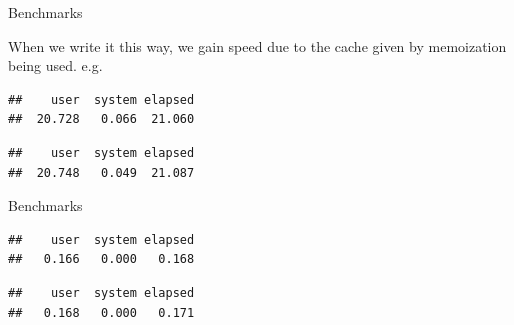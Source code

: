 \begin{frame}[fragile]{Benchmarks}

When we write it this way, we gain speed due to the cache given by
memoization being used. e.g.

\begin{Shaded}
\begin{Highlighting}[]
\NormalTok{(\{}\NormalTok{(}\NormalTok{)\}) }
\end{Highlighting}
\end{Shaded}

\begin{verbatim}
##    user  system elapsed 
##  20.728   0.066  21.060
\end{verbatim}

\begin{Shaded}
\begin{Highlighting}[]
\NormalTok{(\{}\NormalTok{(}\NormalTok{)\})   }
\end{Highlighting}
\end{Shaded}

\begin{verbatim}
##    user  system elapsed 
##  20.748   0.049  21.087
\end{verbatim}

\end{frame}

\begin{frame}[fragile]{Benchmarks}

\begin{Shaded}
\begin{Highlighting}[]
\NormalTok{(\{}\NormalTok{(}\NormalTok{)\}) }
\end{Highlighting}
\end{Shaded}

\begin{verbatim}
##    user  system elapsed 
##   0.166   0.000   0.168
\end{verbatim}

\begin{Shaded}
\begin{Highlighting}[]
\NormalTok{(\{}\NormalTok{(}\NormalTok{)\})   }
\end{Highlighting}
\end{Shaded}

\begin{verbatim}
##    user  system elapsed 
##   0.168   0.000   0.171
\end{verbatim}

\end{frame}

